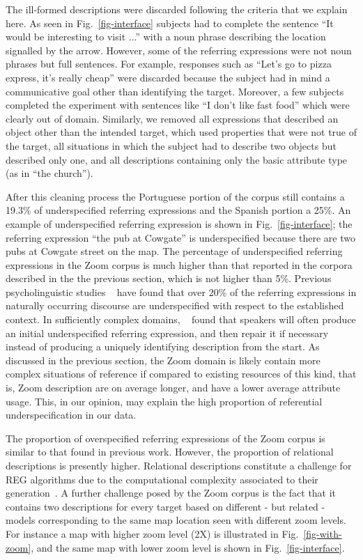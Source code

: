 The ill-formed descriptions were discarded following the criteria that we explain here. As seen in Fig.~\ref{fig-interface} subjects had to complete the sentence ``It would be interesting to visit ...'' with a noun phrase describing the location signalled by the arrow. However, some of the referring expressions were not noun phrases but full sentences. For example, responses such as ``Let's go to pizza express, it's really cheap'' were discarded because the subject had in mind a communicative goal other than identifying the target. Moreover, a few subjects completed the experiment with sentences like ``I don't like fast food'' which were clearly out of domain. Similarly, we removed all expressions that described an object other than the intended target, which used properties that were not true of the target, all situations in which the subject had to describe two objects but described only one, and all descriptions containing only the basic attribute type (as in ``the church'').

After this cleaning process the Portuguese portion of the corpus still contains a 19.3\% of underspecified referring expressions and the Spanish portion a 25\%. An example of underspecified referring expression is shown in Fig.~\ref{fig-interface}; the referring expression ``the pub at Cowgate'' is underspecified because there are two pubs at Cowgate street on the map. The percentage of underspecified referring expressions in the Zoom corpus is much higher than that reported in the corpora described in the the previous section, which is not higher than 5\%. Previous psycholinguistic studies ~\cite{Clark1986} have found that over 20\% of the referring expressions in naturally occurring discourse are underspecified with respect to the established context. In sufficiently complex domains, ~\cite{Clark1986} found that speakers will often produce an initial underspecified referring expression, and then repair it if necessary instead of producing a uniquely identifying description from the start. As discussed in 
the previous section, the Zoom domain is likely contain more complex situations of reference if compared to existing resources of this kind, that is,  Zoom description are on average longer, and have a lower average attribute usage. This, in our opinion, may explain the high proportion of referential underspecification in our data.   

The proportion of overspecified referring expressions of the Zoom corpus is similar to that found in previous work. However, the proportion of relational descriptions is presently higher. Relational descriptions constitute a challenge for REG algorithms due to the computational complexity associated to their generation~\cite{survey}. A further challenge posed by the Zoom corpus is the fact that it contains two descriptions for every target based on different - but related - models corresponding to the same map location seen with different zoom levels. For instance a map with higher zoom level (2X) is illustrated in Fig.~\ref{fig-with-zoom}, and the same map with lower zoom level is shown in Fig.~\ref{fig-interface}. 


